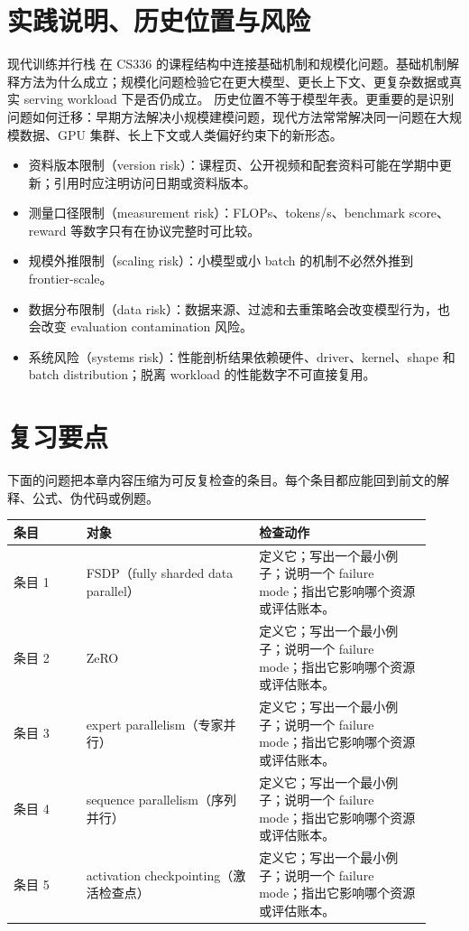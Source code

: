 \documentclass[a4paper]{article}
\begin{document}
\section{实践说明、历史位置与风险}
现代训练并行栈 在 CS336 的课程结构中连接基础机制和规模化问题。基础机制解释方法为什么成立；规模化问题检验它在更大模型、更长上下文、更复杂数据或真实 serving workload 下是否仍成立。
历史位置不等于模型年表。更重要的是识别问题如何迁移：早期方法解决小规模建模问题，现代方法常常解决同一问题在大规模数据、GPU 集群、长上下文或人类偏好约束下的新形态。
\begin{itemize}
\item 资料版本限制（version risk）：课程页、公开视频和配套资料可能在学期中更新；引用时应注明访问日期或资料版本。
\item 测量口径限制（measurement risk）：FLOPs、tokens/s、benchmark score、reward 等数字只有在协议完整时可比较。
\item 规模外推限制（scaling risk）：小模型或小 batch 的机制不必然外推到 frontier-scale。
\item 数据分布限制（data risk）：数据来源、过滤和去重策略会改变模型行为，也会改变 evaluation contamination 风险。
\item 系统风险（systems risk）：性能剖析结果依赖硬件、driver、kernel、shape 和 batch distribution；脱离 workload 的性能数字不可直接复用。
\end{itemize}
\section{复习要点}
下面的问题把本章内容压缩为可反复检查的条目。每个条目都应能回到前文的解释、公式、伪代码或例题。
\begin{longtable}{p{0.16\linewidth}p{0.38\linewidth}p{0.38\linewidth}}
\toprule
\textbf{条目} & \textbf{对象} & \textbf{检查动作}\\
\midrule
条目 1 & FSDP（fully sharded data parallel） & 定义它；写出一个最小例子；说明一个 failure mode；指出它影响哪个资源或评估账本。\\
条目 2 & ZeRO & 定义它；写出一个最小例子；说明一个 failure mode；指出它影响哪个资源或评估账本。\\
条目 3 & expert parallelism（专家并行） & 定义它；写出一个最小例子；说明一个 failure mode；指出它影响哪个资源或评估账本。\\
条目 4 & sequence parallelism（序列并行） & 定义它；写出一个最小例子；说明一个 failure mode；指出它影响哪个资源或评估账本。\\
条目 5 & activation checkpointing（激活检查点） & 定义它；写出一个最小例子；说明一个 failure mode；指出它影响哪个资源或评估账本。\\
\bottomrule
\end{longtable}
\end{document}
